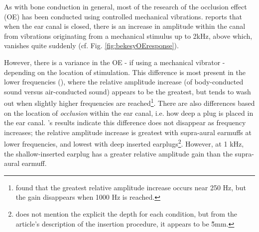 \documentclass[dissertation,copyright]{uathesis}
\begin{document}

 
As with bone conduction in general, most of the research of the occlusion effect (OE) has been conducted using controlled mechanical vibrations.  \cite{bekesy:60} reports that when the ear canal is closed, there is an increase in amplitude within the canal from vibrations originating from a mechanical stimulus up to 2kHz, above which, vanishes quite suddenly (cf. Fig. \ref{fig:bekesyOEresponse}).

However, there is a variance in the OE - if using a mechanical vibrator - depending on the location of stimulation.  This difference is most present in the lower frequencies (\cite{dean:00}), where the relative amplitude increase (of body-conducted sound versus air-conducted sound) appears to be the greatest, but tends to wash out when slightly higher frequencies are reached\footnote{\cite{dean:00} found that the greatest relative amplitude increase occurs near 250 Hz, but the gain disappears when 1000 Hz is reached.}.  There are also differences based on the location of \textit{occlusion} within the ear canal, i.e. how deep a plug is placed in the ear canal. \cite{dean:00}'s results indicate this difference does not disappear as frequency increases; the relative amplitude increase is greatest with supra-aural earmuffs at lower frequencies, and lowest with deep inserted earplugs\footnote{\cite{dean:00} does not mention the explicit the depth for each condition, but from the article's description of the insertion procedure, it appears to be \~5mm.}. However, at 1 kHz, the shallow-inserted earplug has a greater relative amplitude gain than the supra-aural earmuff.
\end{document}
